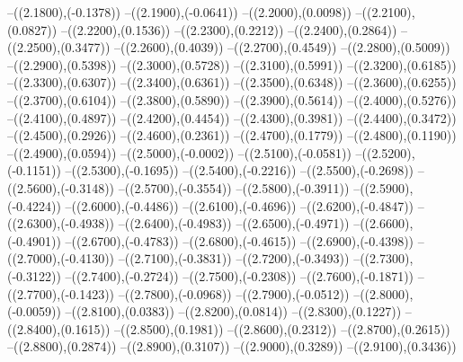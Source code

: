 {	--({\sx*(2.1800)},{\sy*(-0.1378)})
	--({\sx*(2.1900)},{\sy*(-0.0641)})
	--({\sx*(2.2000)},{\sy*(0.0098)})
	--({\sx*(2.2100)},{\sy*(0.0827)})
	--({\sx*(2.2200)},{\sy*(0.1536)})
	--({\sx*(2.2300)},{\sy*(0.2212)})
	--({\sx*(2.2400)},{\sy*(0.2864)})
	--({\sx*(2.2500)},{\sy*(0.3477)})
	--({\sx*(2.2600)},{\sy*(0.4039)})
	--({\sx*(2.2700)},{\sy*(0.4549)})
	--({\sx*(2.2800)},{\sy*(0.5009)})
	--({\sx*(2.2900)},{\sy*(0.5398)})
	--({\sx*(2.3000)},{\sy*(0.5728)})
	--({\sx*(2.3100)},{\sy*(0.5991)})
	--({\sx*(2.3200)},{\sy*(0.6185)})
	--({\sx*(2.3300)},{\sy*(0.6307)})
	--({\sx*(2.3400)},{\sy*(0.6361)})
	--({\sx*(2.3500)},{\sy*(0.6348)})
	--({\sx*(2.3600)},{\sy*(0.6255)})
	--({\sx*(2.3700)},{\sy*(0.6104)})
	--({\sx*(2.3800)},{\sy*(0.5890)})
	--({\sx*(2.3900)},{\sy*(0.5614)})
	--({\sx*(2.4000)},{\sy*(0.5276)})
	--({\sx*(2.4100)},{\sy*(0.4897)})
	--({\sx*(2.4200)},{\sy*(0.4454)})
	--({\sx*(2.4300)},{\sy*(0.3981)})
	--({\sx*(2.4400)},{\sy*(0.3472)})
	--({\sx*(2.4500)},{\sy*(0.2926)})
	--({\sx*(2.4600)},{\sy*(0.2361)})
	--({\sx*(2.4700)},{\sy*(0.1779)})
	--({\sx*(2.4800)},{\sy*(0.1190)})
	--({\sx*(2.4900)},{\sy*(0.0594)})
	--({\sx*(2.5000)},{\sy*(-0.0002)})
	--({\sx*(2.5100)},{\sy*(-0.0581)})
	--({\sx*(2.5200)},{\sy*(-0.1151)})
	--({\sx*(2.5300)},{\sy*(-0.1695)})
	--({\sx*(2.5400)},{\sy*(-0.2216)})
	--({\sx*(2.5500)},{\sy*(-0.2698)})
	--({\sx*(2.5600)},{\sy*(-0.3148)})
	--({\sx*(2.5700)},{\sy*(-0.3554)})
	--({\sx*(2.5800)},{\sy*(-0.3911)})
	--({\sx*(2.5900)},{\sy*(-0.4224)})
	--({\sx*(2.6000)},{\sy*(-0.4486)})
	--({\sx*(2.6100)},{\sy*(-0.4696)})
	--({\sx*(2.6200)},{\sy*(-0.4847)})
	--({\sx*(2.6300)},{\sy*(-0.4938)})
	--({\sx*(2.6400)},{\sy*(-0.4983)})
	--({\sx*(2.6500)},{\sy*(-0.4971)})
	--({\sx*(2.6600)},{\sy*(-0.4901)})
	--({\sx*(2.6700)},{\sy*(-0.4783)})
	--({\sx*(2.6800)},{\sy*(-0.4615)})
	--({\sx*(2.6900)},{\sy*(-0.4398)})
	--({\sx*(2.7000)},{\sy*(-0.4130)})
	--({\sx*(2.7100)},{\sy*(-0.3831)})
	--({\sx*(2.7200)},{\sy*(-0.3493)})
	--({\sx*(2.7300)},{\sy*(-0.3122)})
	--({\sx*(2.7400)},{\sy*(-0.2724)})
	--({\sx*(2.7500)},{\sy*(-0.2308)})
	--({\sx*(2.7600)},{\sy*(-0.1871)})
	--({\sx*(2.7700)},{\sy*(-0.1423)})
	--({\sx*(2.7800)},{\sy*(-0.0968)})
	--({\sx*(2.7900)},{\sy*(-0.0512)})
	--({\sx*(2.8000)},{\sy*(-0.0059)})
	--({\sx*(2.8100)},{\sy*(0.0383)})
	--({\sx*(2.8200)},{\sy*(0.0814)})
	--({\sx*(2.8300)},{\sy*(0.1227)})
	--({\sx*(2.8400)},{\sy*(0.1615)})
	--({\sx*(2.8500)},{\sy*(0.1981)})
	--({\sx*(2.8600)},{\sy*(0.2312)})
	--({\sx*(2.8700)},{\sy*(0.2615)})
	--({\sx*(2.8800)},{\sy*(0.2874)})
	--({\sx*(2.8900)},{\sy*(0.3107)})
	--({\sx*(2.9000)},{\sy*(0.3289)})
	--({\sx*(2.9100)},{\sy*(0.3436)})
}
